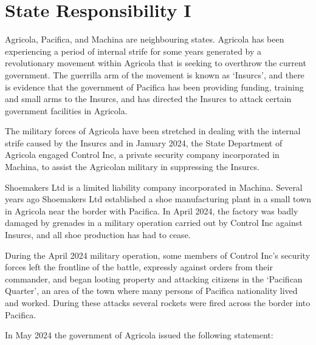 \section{State Responsibility I}
\begin{tutorialquestion}
    \flushleft

    Agricola, Pacifica, and Machina are neighbouring states. Agricola has been experiencing a period of internal strife for some years generated by a revolutionary movement within Agricola that is seeking to overthrow the current government. The guerrilla arm of the movement is known as `Insurcs', and there is evidence that the government of Pacifica has been providing funding, training and small arms to the Insurcs, and has directed the Insurcs to attack certain government facilities in Agricola.
    
    \vspace{\baselineskip}

    The military forces of Agricola have been stretched in dealing with the internal strife caused by the Insurcs and in January 2024, the State Department of Agricola engaged Control Inc, a private security company incorporated in Machina, to assist the Agricolan military in suppressing the Insurcs.

    \vspace{\baselineskip}
    
    Shoemakers Ltd is a limited liability company incorporated in Machina. Several years ago Shoemakers Ltd established a shoe manufacturing plant in a small town in Agricola near the border with Pacifica. In April 2024, the factory was badly damaged by grenades in a military operation carried out by Control Inc against Insurcs, and all shoe production has had to cease.
    
    \vspace{\baselineskip}
    
    During the April 2024 military operation, some members of Control Inc’s security forces left the frontline of the battle, expressly against orders from their commander, and began looting property and attacking citizens in the ‘Pacifican Quarter’, an area of the town where many persons of Pacifica nationality lived and worked. During these attacks several rockets were fired across the border into Pacifica.

    \vspace{\baselineskip}

    In May 2024 the government of Agricola issued the following statement:
    

\end{tutorialquestion}
